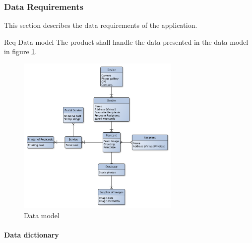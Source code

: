 \documentclass[10pt,a4paper]{article}
\begin{document}
	

\subsubsection{Data Requirements}
This section describes the data requirements of the application.


\begin {description}
	\item [Req \thesubsubsection {.\thedata} Data model] The product shall handle the data presented in the data model in figure \ref{fig:datamodel}.
\end{description}

\begin{figure}[h!]
\centering
\includegraphics[width=0.7\textwidth]{Data_figures/DataModel.pdf}
\caption{Data model}
\label{fig:datamodel}
\end{figure}
\FloatBarrier
\paragraph{Data dictionary}

%
%
%
\end{document}

